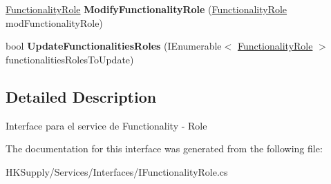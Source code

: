 \begin{DoxyCompactItemize}
\mbox{\label{interface_h_k_supply_1_1_services_1_1_interfaces_1_1_i_functionality_role_af8f8d673b36ae48f98abfa43cfe59863}} 
\mbox{\hyperlink{class_h_k_supply_1_1_models_1_1_functionality_role}{Functionality\+Role}} {\bfseries Modify\+Functionality\+Role} (\mbox{\hyperlink{class_h_k_supply_1_1_models_1_1_functionality_role}{Functionality\+Role}} mod\+Functionality\+Role)
\item 
\mbox{\label{interface_h_k_supply_1_1_services_1_1_interfaces_1_1_i_functionality_role_a816ae3d8bb97d20aa19d3608d96528e5}} 
bool {\bfseries Update\+Functionalities\+Roles} (I\+Enumerable$<$ \mbox{\hyperlink{class_h_k_supply_1_1_models_1_1_functionality_role}{Functionality\+Role}} $>$ functionalities\+Roles\+To\+Update)
\end{DoxyCompactItemize}


\subsection{Detailed Description}
Interface para el service de Functionality -\/ Role 



The documentation for this interface was generated from the following file\+:\begin{DoxyCompactItemize}
\item 
H\+K\+Supply/\+Services/\+Interfaces/I\+Functionality\+Role.\+cs\end{DoxyCompactItemize}
